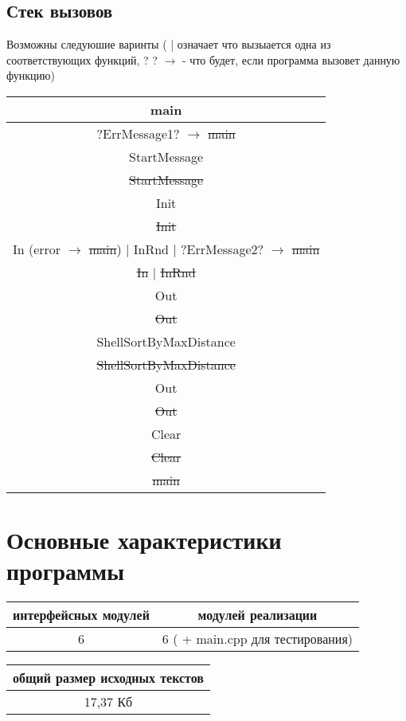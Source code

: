 \documentclass[a4paper]{article}
\begin{document}
\subsection*{Стек вызовов}
Возможны следуюшие варинты ( | означает что вызыается одна из соответствующих функций, ? ? $\rightarrow$ - что будет, если программа вызовет данную функцию)
\\
\begin{tabular}{ ||c|| }
    \hline
    main\\
    \hline
    ?ErrMessage1? $\rightarrow$ \sout{main}\\
    \hline
    StartMessage\\
    \hline
    \sout{StartMessage}\\
    \hline
    Init\\
    \hline
    \sout{Init}\\
    \hline
    In (error $\rightarrow$ \sout{main}) | InRnd | ?ErrMessage2? $\rightarrow$ \sout{main}\\
    \hline
    \sout{In} | \sout{InRnd}\\
    \hline
    Out\\
    \hline
    \sout{Out}\\
    \hline
    ShellSortByMaxDistance\\
    \hline
    \sout{ShellSortByMaxDistance}\\
    \hline
    Out\\
    \hline
    \sout{Out}\\
    \hline
    Clear\\
    \hline
    \sout{Clear}\\
    \hline
    \sout{main}\\
    \hline
\end{tabular}

\newpage
\section*{Основные характеристики программы}

\begin{tabular}{ |c|c| }   
    \hline   
    интерфейсных модулей & модулей реализации\\
    \hline
    6 & 6 ( + main.cpp для тестирования)\\    
    \hline
\end{tabular}


\begin{tabular}{ |c| }   
    \hline   
    общий размер исходных текстов\\
    \hline
    17,37 Кб\\
    \hline
\end{tabular}
\end{document}
